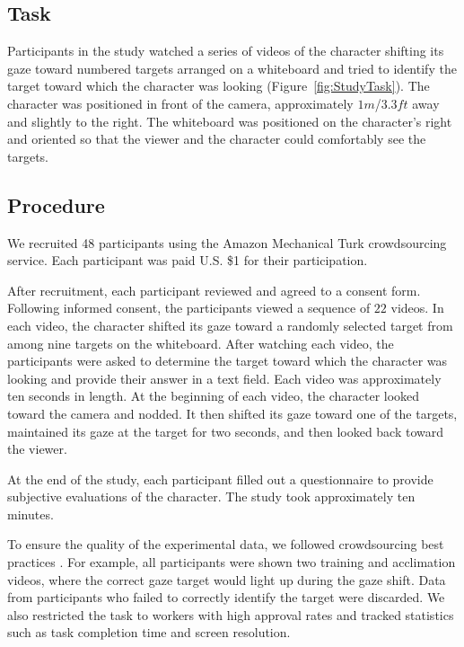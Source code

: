 \subsection{Task}

Participants in the study watched a series of videos of the character shifting its gaze toward numbered targets arranged on a whiteboard and tried to identify the target toward which the character was looking (Figure~\ref{fig:StudyTask}). The character was positioned in front of the camera, approximately $1 m$/$3.3 ft$ away and slightly to the right. The whiteboard was positioned on the character's right and oriented so that the viewer and the character could comfortably see the targets.

\subsection{Procedure}

We recruited 48 participants using the Amazon Mechanical Turk crowdsourcing service. Each participant was paid U.S. \$1 for their participation.

After recruitment, each participant reviewed and agreed to a consent form. Following informed consent, the participants viewed a sequence of $22$ videos. In each video, the character shifted its gaze toward a randomly selected target from among nine targets on the whiteboard. After watching each video, the participants were asked to determine the target toward which the character was looking and provide their answer in a text field. Each video was approximately ten seconds in length. At the beginning of each video, the character looked toward the camera and nodded. It then shifted its gaze toward one of the targets, maintained its gaze at the target for two seconds, and then looked back toward the viewer.

At the end of the study, each participant filled out a questionnaire to provide subjective evaluations of the character. The study took approximately ten minutes.

To ensure the quality of the experimental data, we followed crowdsourcing best practices \citep{kittur2008crowdsourcing}. For example, all participants were shown two training and acclimation videos, where the correct gaze target would light up during the gaze shift. Data from participants who failed to correctly identify the target were discarded. We also restricted the task to workers with high approval rates and tracked statistics such as task completion time and screen resolution.

